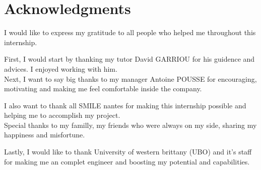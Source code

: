 \section{Acknowledgments}
I would like to express my gratitude to all people who helped me throughout this internship.


\vspace{20px}
First, I would start by thanking my tutor \og David GARRIOU \fg for his guidence and advices. I enjoyed working with him.\\



\vspace{5px}
Next, I want to say big thanks to my manager \og Antoine POUSSE \fg for encouraging, motivating and making me feel comfortable inside the company. \\
\vspace{10px}

I also want to thank all \og SMILE nantes \fg for making this internship possible and helping me to accomplish my project.\\

\vspace{10px}
Special thanks to my familly, my friends who were always on my side, sharing my happiness and misfortune.

\vspace{20px}
Lastly, I would like to thank University of western brittany (UBO) and it's staff for making me an complet engineer and boosting my potential and capabilities.
